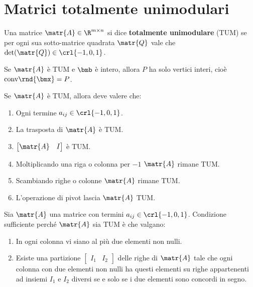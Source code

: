 \documentclass[\main/main.tex]{subfiles}
\begin{document}
\section{Matrici totalmente unimodulari}


\begin{definition}
  Una matrice $\matr{A} \in \R^{m \times n}$ si dice \textbf{totalmente unimodulare} (TUM) se per ogni sua sotto-matrice quadrata $\matr{Q}$ vale che $\det(\matr{Q}) \in \crl{-1, 0, 1}$.
\end{definition}

\begin{theorem}
  Se $\matr{A}$ è TUM e $\bmb$ è intero, allora $P$ ha solo vertici interi, cioè $\text{conv}\rnd{\bmx} = P$.
\end{theorem}

\begin{theorem}
  Se $\matr{A}$ è TUM, allora deve valere che:
  \begin{enumerate}
    \item Ogni termine $a_{ij} \in \crl{-1,0,1}$.
    \item La trasposta di $\matr{A}$ è TUM.
    \item $\begin{bmatrix}
              \matr{A} & I
            \end{bmatrix}$ è TUM.
    \item Moltiplicando una riga o colonna per $-1$ $\matr{A}$ rimane TUM.
    \item Scambiando righe o colonne $\matr{A}$ rimane TUM.
    \item L'operazione di pivot lascia $\matr{A}$ TUM.
  \end{enumerate}
\end{theorem}

\begin{theorem}
  Sia $\matr{A}$ una matrice con termini $a_{ij} \in \crl{-1,0,1}$. Condizione sufficiente perché $\matr{A}$ sia TUM è che valgano:
  \begin{enumerate}
    \item In ogni colonna vi siano al più due elementi non nulli.
    \item Esiste una partizione $\begin{bmatrix}
              I_1 & I_2
            \end{bmatrix}$ delle righe di $\matr{A}$ tale che ogni colonna con due elementi non nulli ha questi elementi su righe appartenenti ad insiemi $I_1$ e $I_2$ diversi se e solo se i due elementi sono concordi in segno.
  \end{enumerate}
\end{theorem}
\end{document}
